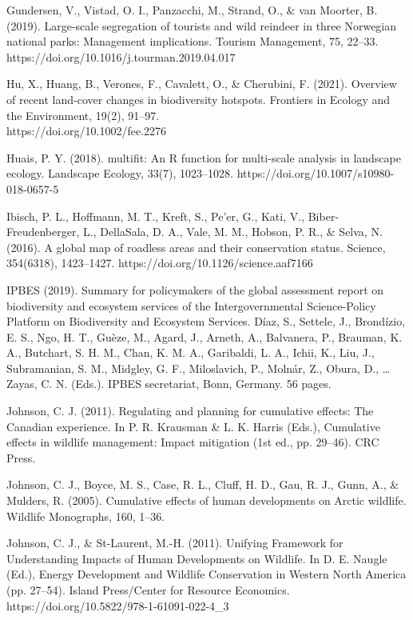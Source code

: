 \documentclass[titlepage]{article}
\begin{document}
Gundersen, V., Vistad, O. I., Panzacchi, M., Strand, O., & van Moorter, B. (2019). Large-scale segregation of tourists and wild reindeer in three Norwegian national parks: Management implications. Tourism Management, 75, 22–33. https://doi.org/10.1016/j.tourman.2019.04.017

Hu, X., Huang, B., Verones, F., Cavalett, O., & Cherubini, F. (2021). Overview of recent land‐cover changes in biodiversity hotspots. Frontiers in Ecology and the Environment, 19(2), 91–97. \\ https://doi.org/10.1002/fee.2276

Huais, P. Y. (2018). multifit: An R function for multi-scale analysis in landscape ecology. Landscape Ecology, 33(7), 1023–1028. https://doi.org/10.1007/s10980-018-0657-5

Ibisch, P. L., Hoffmann, M. T., Kreft, S., Pe’er, G., Kati, V., Biber-Freudenberger, L., DellaSala, D. A., Vale, M. M., Hobson, P. R., & Selva, N. (2016). A global map of roadless areas and their conservation status. Science, 354(6318), 1423–1427. https://doi.org/10.1126/science.aaf7166

IPBES (2019). Summary for policymakers of the global assessment report on biodiversity and ecosystem services of the Intergovernmental Science-Policy Platform on Biodiversity and Ecosystem Services. Díaz, S., Settele, J., Brondízio, E. S., Ngo, H. T., Guèze, M., Agard, J., Arneth, A., Balvanera, P., Brauman, K. A., Butchart, S. H. M., Chan, K. M. A., Garibaldi, L. A., Ichii, K., Liu, J., Subramanian, S. M., Midgley, G. F., Miloslavich, P., Molnár, Z., Obura, D., … Zayas, C. N. (Eds.). IPBES secretariat,  Bonn, Germany. 56 pages.

Johnson, C. J. (2011). Regulating and planning for cumulative effects: The Canadian experience. In P. R. Krausman & L. K. Harris (Eds.), Cumulative effects in wildlife management: Impact mitigation (1st ed., pp. 29–46). CRC Press.

Johnson, C. J., Boyce, M. S., Case, R. L., Cluff, H. D., Gau, R. J., Gunn, A., & Mulders, R. (2005). Cumulative effects of human developments on Arctic wildlife. Wildlife Monographs, 160, 1–36.

Johnson, C. J., & St-Laurent, M.-H. (2011). Unifying Framework for Understanding Impacts of Human Developments on Wildlife. In D. E. Naugle (Ed.), Energy Development and Wildlife Conservation in Western North America (pp. 27–54). Island Press/Center for Resource Economics.\\ https://doi.org/10.5822/978-1-61091-022-4_3
\end{document}
